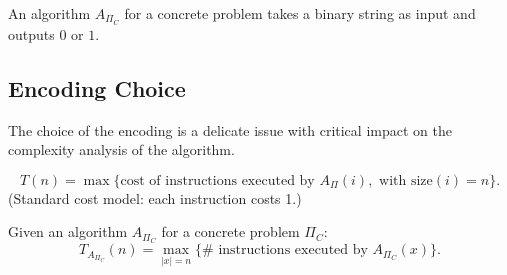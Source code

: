 An algorithm $A_{\Pi_C}$ for a concrete problem takes a binary string as input and outputs $0$ or $1$.

\subsection{Encoding Choice} 
The choice of the encoding is a delicate issue with critical impact on the complexity analysis of the algorithm.

\[
T(n)=\max\{\text{cost of instructions executed by }A_\Pi(i),\text{ with size}(i)=n\}.
\]
(Standard cost model: each instruction costs 1.)

Given an algorithm $A_{\Pi_C}$ for a concrete problem $\Pi_C$:
\[
T_{A_{\Pi_C}}(n)=\max_{|x|=n}\{\#\text{ instructions executed by }A_{\Pi_C}(x)\}.
\]
